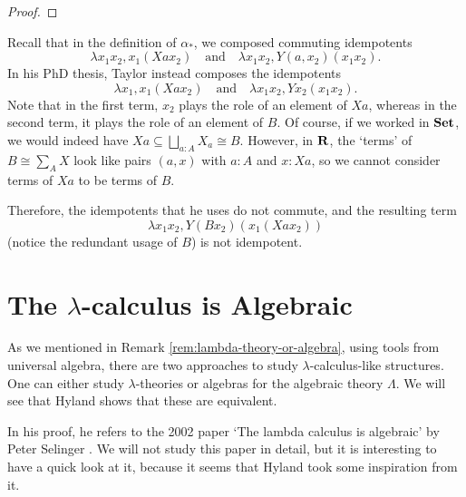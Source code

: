 \begin{proof}
\end{proof}

\begin{remark}
  Recall that in the definition of $ \alpha_* $, we composed commuting idempotents
  \[ \lambda x_1 x_2, x_1 (X a x_2) \quad \text{and} \quad \lambda x_1 x_2, Y (a, x_2) (x_1 x_2). \]
  In his PhD thesis, Taylor instead composes the idempotents
  \[ \lambda x_1, x_1 (X a x_2) \quad \text{and} \quad \lambda x_1 x_2, Y x_2 (x_1 x_2). \]
  Note that in the first term, $ x_2 $ plays the role of an element of $ X a $, whereas in the second term, it plays the role of an element of $ B $. Of course, if we worked in $ \mathbf{Set} $, we would indeed have $ X a \subseteq \bigsqcup_{a : A} X_a \cong B $. However, in $ \mathbf{R} $, the `terms' of $ B \cong \sum_A X $ look like pairs $ (a, x) $ with $ a : A $ and $ x : X a $, so we cannot consider terms of $ X a $ to be terms of $ B $.

  Therefore, the idempotents that he uses do not commute, and the resulting term
  \[ \lambda x_1 x_2, Y (B x_2) (x_1 (X a x_2)) \]
  (notice the redundant usage of $ B $) is not idempotent.
\end{remark}

\section{The \texorpdfstring{$ \lambda $}{lambda}-calculus is Algebraic}
As we mentioned in Remark \ref{rem:lambda-theory-or-algebra}, using tools from universal algebra, there are two approaches to study $ \lambda $-calculus-like structures. One can either study $ \lambda $-theories or algebras for the algebraic theory $ \Lambda $. We will see that Hyland shows that these are equivalent.

In his proof, he refers to the 2002 paper `The lambda calculus is algebraic' by Peter Selinger \autocite{selinger-lambda-calculus-algebraic}. We will not study this paper in detail, but it is interesting to have a quick look at it, because it seems that Hyland took some inspiration from it.

